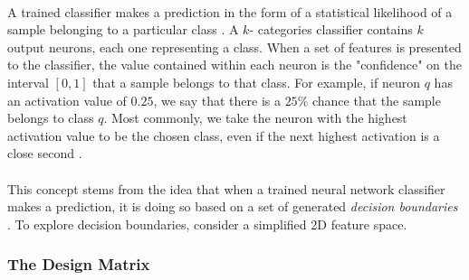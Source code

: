 \documentclass[12pt,letterpaper]{article}
\begin{document}
\paragraph*{}A trained classifier makes a prediction in the form of a statistical likelihood of a sample belonging to a particular class \cite{Goodfellow,James}. A $k$- categories classifier contains $k$ output neurons, each one representing a class. When a set of features is presented to the classifier, the value contained within each neuron is the "confidence" on the interval $[0,1]$ that a sample belongs to that class. For example, if neuron $q$ has an activation value of $0.25$, we say that there is a $25\%$ chance that the sample belongs to class $q$. Most commonly, we take the neuron with the highest activation value to be the chosen class, even if the next highest activation is a close second \cite{Loy}. 

\paragraph*{}This concept stems from the idea that when a trained neural network classifier makes a prediction, it is doing so based on a set of generated \textit{decision boundaries} \cite{Geron,James}. To explore decision boundaries, consider a simplified 2D feature space.



\subsubsection{The Design Matrix}
\label{subsubsec-DesignMatrix}
\end{document}
